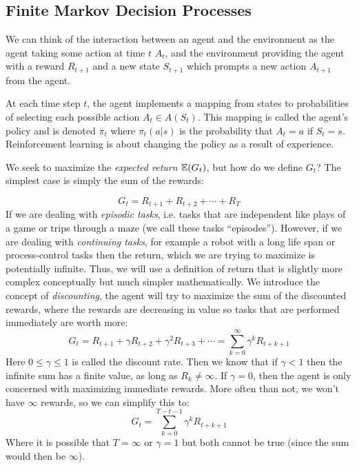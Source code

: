     \subsection{Finite Markov Decision Processes}
    We can think of the interaction between an agent and the environment as the 
    agent taking some action at time $t$ $A_t$, and the environment providing 
    the agent with a reward $R_{t+1}$ and a new state $S_{t+1}$ which prompts a 
    new action $A_{t+1}$ from the agent.
    
    At each time step $t$, the agent implements a mapping from states to 
    probabilities of selecting each possible action $A_t \in A(S_t)$. This 
    mapping is called the agent's policy and is denoted $\pi_t$ where 
    $\pi_t(a|s)$ is the probability that $A_t=a$ if $S_t=s$. Reinforcement 
    learning is about changing the policy as a result of experience.
    
    We seek to maximize the \textit{expected return} $\mathbb{E}({G_t})$, but how do 
    we define $G_t$? The simplest case is simply the sum of the rewards:
    
    \begin{equation*}
        G_t = R_{t+1}+R_{t+2}+\cdots+R_T
    \end{equation*}
    If we are dealing with \textit{episodic tasks}, i.e. tasks that are 
    independent like plays of a game or trips through a maze (we call these 
    tasks ``episodes''). However, if we 
    are dealing with \textit{continuing tasks}, for example a robot with a long 
    life span or process-control tasks then the return, which we are trying to 
    maximize is potentially infinite. Thus, we will use a definition of return 
    that is slightly more complex conceptually but much simpler mathematically. 
    We introduce the concept of \textit{discounting}, the agent will try to 
    maximize the sum of the discounted rewards, where the rewards are 
    decreasing in value so tasks that are performed immediately are worth more:
    \begin{equation*}
        G_t=R_{t+1}+\gamma R_{t+2}+ \gamma ^2 R_{t+3} + \cdots = 
        \sum_{k=0}^{\infty}\gamma^k R_{t+k+1}
    \end{equation*}
    Here $0\leq \gamma \leq 1$ is called the discount rate. Then we know that 
    if $\gamma < 1$ then the infinite sum has a finite value, as long as 
    $R_k\neq \infty$. If $\gamma = 0$, then the agent is only concerned with 
    maximizing immediate rewards. More often than not, we won't have $\infty$ 
    rewards, so we can simplify this to:
    \begin{equation*}
        G_t=\sum_{k=0}^{T-t-1}\gamma^k R_{t+k+1}
    \end{equation*}
    Where it is possible that $T=\infty$ or $\gamma = 1$ but both cannot be 
    true (since the sum would then be $\infty$).
    
